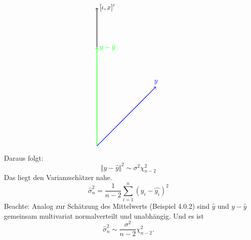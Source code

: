 \documentclass[10pt]{article}
\newcommand{\sni}{\sum_{i=1}^{n}} %
\begin{document}
\begin{itemize}
\begin{align*}
\begin{tikzpicture}
							\draw[thick, green, ->] (0,0) -- (0,5) node[right] {$y-\hat{y}$};
							\draw[thick, ->] (0,5) -- (0,7) node[right] {$[\iota, x]'$};
							\draw[thick, blue, ->] (0,0) -- (3,3) node[above]{$y$};
						\end{tikzpicture}
					\end{align*}
					Daraus folgt:
					\begin{equation*}
						\Vert y- \hat{y} \Vert^2 \sim \sigma^2 \chi^2_{n-2}
					\end{equation*}
					Das liegt den Varianzschätzer nahe.
					\begin{equation*}
						\hat{\sigma}^2_n = \frac{1}{n-2} \sni (y_i - \hat{y_i})^2
					\end{equation*}
					Beachte: Analog zur Schätzung des Mittelwerts (Beispiel 4.0.2) sind $\hat{y}$ und $y-\hat{y}$ gemeinsam multivariat normalverteilt und unabhängig. Und es ist 
					\begin{equation*}
						\hat{\sigma}^2_n \sim \frac{\sigma^2}{n-2} \chi^2_{n-2}.
					\end{equation*}
				\end{itemize}
\end{document}

